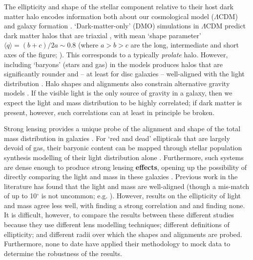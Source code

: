 \documentclass[useAMS,usenatbib]{mn2e}
\newcommand{\cb}[1]{{\color{red} \textbf{#1}}}
\begin{document}
The ellipticity and shape of the stellar component relative to their host dark matter halo encodes information both about our cosmological model ($\Lambda$CDM) and galaxy formation \citep[e.g.][]{1994ApJ...431..617D,2001ApJ...551..294I,2004ApJ...611L..73K,2007MNRAS.378...55M,2007arXiv0707.0737D,2012MNRAS.424L..16L,2014JPhG...41f3101R}. `Dark-matter-only' (DMO) simulations in $\Lambda$CDM predict dark matter halos that are triaxial \citep{1991ApJ...378..496D,1992ApJ...399..405W,1996ApJ...462..563N,2002ApJ...574..538J}, with mean `shape parameter' $\langle q \rangle = (b+c)/2a \sim 0.8$ (where $a > b > c$ are the long, intermediate and short axes of the figure; \citealt{2007MNRAS.378...55M}). This corresponds to a typically {\it prolate} halo. However, including `baryons' (stars and gas) in the models produces halos that are significantly rounder and -- at least for disc galaxies -- well-aligned with the light distribution \citep{1991ApJ...377..365K,1994ApJ...431..617D,2007arXiv0707.0737D}. Halo shapes and alignments also constrain alternative gravity models \citep{2001MNRAS.327..552M,2004ApJ...610L..97H,2005MNRAS.361..971R,2012PhRvD..86h3507F,2013MNRAS.434.2971D}. If the visible light is the only source of gravity in a galaxy, then we expect the light and mass distribution to be highly correlated; if dark matter is present, however, such correlations can at least in principle be broken.

Strong lensing provides a unique probe of the alignment and shape of the total mass distribution in galaxies \citep[e.g.][]{1986ApJ...310..568B,1992grle.book.....S,1998ApJ...509..561K,2000ApJ...543..131K,2006ApJ...649..599K,2007AJ....134..668A,2008MNRAS.383..857F,2010ApJ...724..511A,2012MNRAS.424..104L}. For `red and dead' ellipticals that are largely devoid of gas, their baryonic content can be mapped through stellar population synthesis modelling of their light distribution alone \citep[e.g.][]{2005ApJ...623L...5F,2006ApJ...640..662T,2008MNRAS.383..857F}. Furthermore, such systems are dense enough to produce strong lensing \cb{effects}, opening up the possibility of directly comparing the light and mass in these galaxies \citep{1998ApJ...509..561K,2008MNRAS.383..857F,2009ApJ...690..670T,2012A&A...538A..99S}. Previous work in the literature has found that the light and mass are well-aligned (though a mis-match of up to 10$^\circ$ is not uncommon; e.g. \citealt{2012A&A...538A..99S}). However, results on the ellipticity of light and mass agree less well, with \citet{2012A&A...538A..99S} finding a strong correlation and \citet{1998ApJ...509..561K} and \citet{2008MNRAS.383..857F} finding none. It is difficult, however, to compare the results between these different studies because they use different lens modelling techniques; different definitions of ellipticity; and different radii over which the shapes and alignments are probed. Furthermore, none to date have applied their methodology to mock data to determine the robustness of the results.
\end{document}
